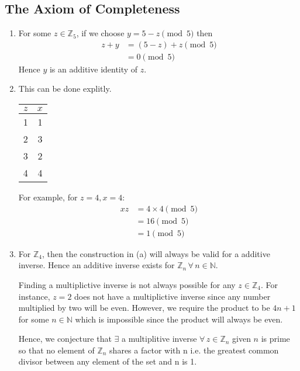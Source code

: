\subsection{The Axiom of Completeness}

\begin{enumerate}[label=(\alph*)]

    \item
    For some $z \in \mathbb{Z}_5$, if we choose $y = 5 - z \pmod 5$ then
    \begin{align*}
        z + y   &= (5 - z) + z \pmod 5 \\
                &= 0 \pmod 5 
    \end{align*}
    Hence $y$ is an additive identity of $z$.

    \item
    This can be done explitly. \\
    \begin{center}
        \begin{tabular}{cc}
            \toprule
            $z$ & $x$ \\
            \midrule
            1 & 1 \\
            2 & 3 \\
            3 & 2 \\
            4 & 4 \\
            \bottomrule
        \end{tabular}
    \end{center}

    For example, for $z = 4, x = 4$:
    \begin{align*}
        xz  &= 4 \times 4 \pmod 5 \\
            &= 16 \pmod 5 \\
            &= 1 \pmod 5
    \end{align*}

    \item
    For $\mathbb{Z}_4$, then the construction in (a) will always be valid for a additive
    inverse. Hence an additive inverse exists for $\mathbb{Z}_n \, \forall \, n \in \mathbb N$. 

    Finding a multiplictive inverse is not always possible for any $z \in \mathbb Z_4$. For
    instance, $z = 2$ does not have a multiplictive inverse since any number multiplied
    by two will be even. However, we require the product to be $4n+1$ for some $n \in \mathbb N$
    which is impossible since the product will always be even.

    Hence, we conjecture that $\exists$ a multiplitive inverse $\forall \, z \in \mathbb Z_n$
    given $n$ is prime so that no element of $\mathbb Z_n$ shares a factor with n i.e. the greatest
    common divisor between any element of the set and n is 1.
    
\end{enumerate}

